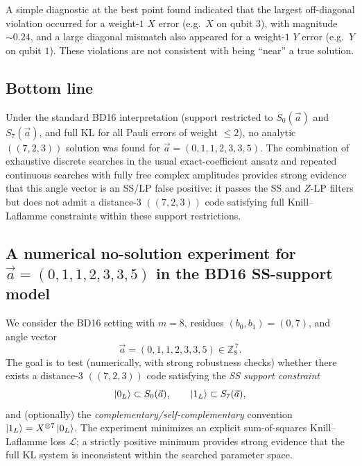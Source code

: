 \documentclass[11pt]{article}
\begin{document}
A simple diagnostic at the best point found indicated that the largest off-diagonal violation occurred for a weight-\(1\)
\(X\) error (e.g.\ \(X\) on qubit \(3\)), with magnitude \(\sim 0.24\), and a large diagonal mismatch also appeared for a
weight-\(1\) \(Y\) error (e.g.\ \(Y\) on qubit \(1\)). These violations are not consistent with being ``near'' a true solution.

\subsection{Bottom line}
Under the standard BD16 interpretation (support restricted to \(S_0(\vec a)\) and \(S_7(\vec a)\), and full KL for all Pauli
errors of weight \(\le 2\)), no analytic \(((7,2,3))\) solution was found for \(\vec a=(0,1,1,2,3,3,5)\).
The combination of exhaustive discrete searches in the usual exact-coefficient ansatz and repeated continuous searches with
fully free complex amplitudes provides strong evidence that this angle vector is an SS/LP false positive: it passes the SS and
\(Z\)-LP filters but does not admit a distance-\(3\) \(((7,2,3))\) code satisfying full Knill--Laflamme constraints within these
support restrictions.

\subsection{A numerical no-solution experiment for \texorpdfstring{$\vec a=(0,1,1,2,3,3,5)$}{a=(0,1,1,2,3,3,5)} in the BD16 SS-support model}

We consider the BD16 setting with \(m=8\), residues \((b_0,b_1)=(0,7)\), and angle vector
\[
\vec a=(0,1,1,2,3,3,5)\in\mathbb{Z}_8^{\,7}.
\]
The goal is to test (numerically, with strong robustness checks) whether there exists a distance-\(3\) \(((7,2,3))\) code
satisfying the \emph{SS support constraint}
\[
\ket{0_L}\subset S_0(\vec a),\qquad \ket{1_L}\subset S_7(\vec a),
\]
and (optionally) the \emph{complementary/self-complementary} convention \(\ket{1_L}=X^{\otimes 7}\ket{0_L}\).
The experiment minimizes an explicit sum-of-squares Knill--Laflamme loss \(\mathcal{L}\); a strictly positive minimum provides
strong evidence that the full KL system is inconsistent within the searched parameter space.
\end{document}
